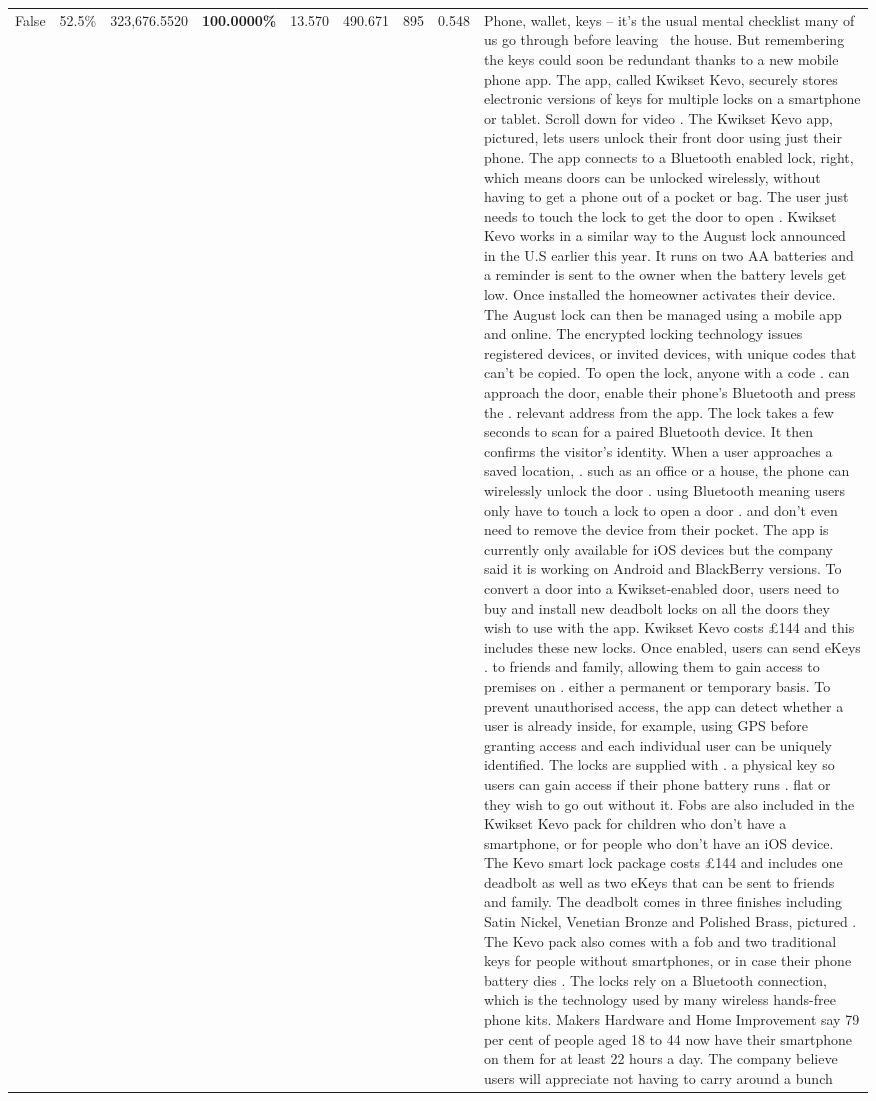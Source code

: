\begin{table}[H]
\begin{tabular}{lllrlllll}
False & 52.5\% & 323,676.5520 & \bfseries \color{red} 100.0000\% & 13.570 & 490.671 & 895 & 0.548 & Phone, wallet, keys – it’s the usual mental checklist many of us go through before leaving  the house. But remembering the keys could soon be redundant thanks to a new mobile phone app. The app, called Kwikset Kevo, securely stores electronic versions of keys for multiple locks on a smartphone or tablet. Scroll down for video . The Kwikset Kevo app, pictured, lets users unlock their front door using just their phone. The app connects to a Bluetooth enabled lock, right, which means doors can be unlocked wirelessly, without having to get a phone out of a pocket or bag. The user just needs to touch the lock to get the door to open . Kwikset Kevo works in a similar way to the August lock announced in the U.S earlier this year. It runs on two AA batteries and a reminder is sent to the owner when the battery levels get low. Once installed the homeowner activates their device. The August lock can then be managed using a mobile app and online. The encrypted locking technology issues registered devices, or invited devices, with unique codes that can't be copied. To open the lock, anyone with a code . can approach the door, enable their phone's Bluetooth and press the . relevant address from the app. The lock takes a few seconds to scan for a paired Bluetooth device. It then confirms the visitor's identity. When a user approaches a saved location, . such as an office or a house, the phone can wirelessly unlock the door . using Bluetooth meaning users only have to touch a lock to open a door . and don't even need to remove the device from their pocket. The app is currently only available for iOS devices but the company said it is working on Android and BlackBerry versions. To convert a door into a Kwikset-enabled door, users need to buy and install new deadbolt locks on all the doors they wish to use with the app. Kwikset Kevo costs £144 and this includes these new locks. Once enabled, users can send eKeys . to friends and family, allowing them to gain access to premises on . either a permanent or temporary basis. To prevent unauthorised access, the app can detect whether a user is already inside, for example, using GPS before granting access and each individual user can be uniquely identified. The locks are supplied with . a physical key so users can gain access if their phone battery runs . flat or they wish to go out without it. Fobs are also included in the Kwikset Kevo pack for children who don't have a smartphone, or for people who don't have an iOS device. The Kevo smart lock package costs £144 and includes one deadbolt as well as two eKeys that can be sent to friends and family. The deadbolt comes in three finishes including Satin Nickel, Venetian Bronze and Polished Brass, pictured . The Kevo pack also comes with a fob and two traditional keys for people without smartphones, or in case their phone battery dies . The locks rely on a Bluetooth connection, which is the technology used by many wireless hands-free phone kits. Makers Hardware and Home Improvement say 79 per cent of people aged 18 to 44 now have their smartphone on them for at least 22 hours a day. The company believe users will appreciate not having to carry around a bunch 
\end{tabular}
\end{table}
